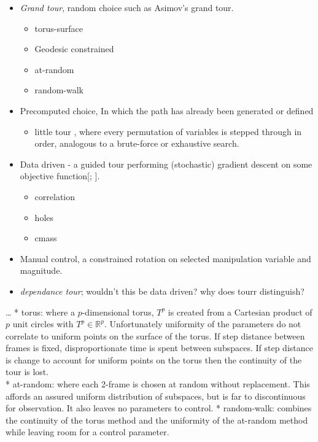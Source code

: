 \documentclass{monashthesis}
\begin{document}
\begin{itemize}
\tightlist
\item
  \emph{Grand tour}, random choice such as Asimov's grand
  tour\autocite{asimov_grand_1985}.

  \begin{itemize}
  \tightlist
  \item
    torus-surface
  \item
    Geodesic constrained
  \item
    at-random
  \item
    random-walk
  \end{itemize}
\item
  Precomputed choice, In which the path has already been generated or
  defined

  \begin{itemize}
  \tightlist
  \item
    little tour \autocite{mcdonald_interactive_1982}, where every
    permutation of variables is stepped through in order, analogous to a
    brute-force or exhaustive search.
  \end{itemize}
\item
  Data driven - a guided tour performing (stochastic) gradient descent
  on some objective function{[}\textcite{hurley_analyzing_1990}; {]}.

  \begin{itemize}
  \tightlist
  \item
    correlation
  \item
    holes
  \item
    cmass
  \end{itemize}
\item
  Manual control, a constrained rotation on selected manipulation
  variable and magnitude\autocite{cook_manual_1997}.
\item
  \emph{dependance tour}; wouldn't this be data driven? why does tourr
  distinguish?
\end{itemize}

\ldots{} * torus: where a \(p\)-dimensional torus, \(T^p\) is created
from a Cartesian product of \(p\) unit circles with
\(T^p \in \mathbb{R}^p\). Unfortunately uniformity of the parameters do
not correlate to uniform points on the surface of the torus. If step
distance between frames is fixed, disproportionate time is spent between
subspaces. If step distance is change to account for uniform points on
the torus then the continuity of the tour is lost.\\
* at-random: where each 2-frame is chosen at random without replacement.
This affords an assured uniform distribution of subspaces, but is far to
discontinuous for observation. It also leaves no parameters to control.
* random-walk: combines the continuity of the torus method and the
uniformity of the at-random method while leaving room for a control
parameter.
\end{document}
